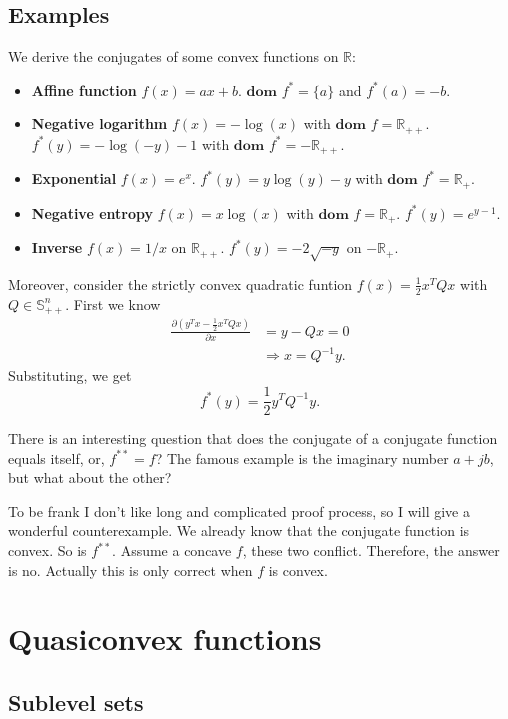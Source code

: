 \documentclass[lang=en,color=blue,mode=fancy,titlestyle=hang]{elegantbook}
\begin{document}
\subsection{Examples}

We derive the conjugates of some convex functions on $\mathbb{R}$:
\begin{itemize}
  \item \textbf{Affine function} $f(x) = ax + b$. $\textbf{dom } f^* = \{a\}$ and
  $f^*(a) = -b$.
  \item \textbf{Negative logarithm} $f(x) = -\log(x)$ with $\textbf{dom } f = \mathbb{R}_{++}$.
  $f^*(y) = -\log(-y) - 1$ with $\textbf{dom } f^* = -\mathbb{R}_{++}$.
  \item \textbf{Exponential} $f(x) = e^x$. $f^*(y) = y\log(y) - y$ with
  $\textbf{dom } f^* = \mathbb{R}_+$.
  \item \textbf{Negative entropy} $f(x) = x\log(x)$ with $\textbf{dom } f = \mathbb{R}_+$.
  $f^*(y) = e^{y-1}$.
  \item \textbf{Inverse} $f(x) = 1/x$ on $\mathbb{R}_{++}$. $f^*(y) = -2 \sqrt{-y}$ on
  $-\mathbb{R}_+$.
\end{itemize}

Moreover, consider the strictly convex quadratic funtion $f(x) = \frac12 x^T Q x$ with
$Q \in \mathbb{S}^n_{++}$. First we know
\begin{align*}
  \frac{\partial (y^T x - \frac12 x^T Q x)}{\partial x} &= y - Qx = 0 \\
  &\Rightarrow x = Q^{-1} y.
\end{align*}
Substituting, we get
\[
f^*(y) = \frac12 y^T Q^{-1} y.
\]

There is an interesting question that does the conjugate of a conjugate function equals
itself, or, $f^{**} = f$? The famous example is the imaginary number $a + jb$, but what
about the other?

To be frank I don't like long and complicated proof process, so I will give a wonderful
counterexample. We already know that the conjugate function is convex. So is $f^{**}$.
Assume a concave $f$, these two conflict. Therefore, the answer is no. Actually this
is only correct when $f$ is convex.

\section{Quasiconvex functions}
\subsection{Sublevel sets}
\end{document}
